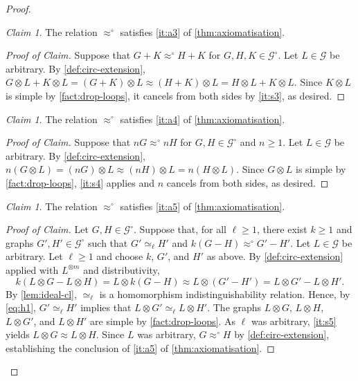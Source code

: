 \documentclass[11pt]{scrartcl}
\theoremstyle{definition}
\theoremstyle{plain}
\theoremstyle{remark}
\newtheorem{claim}[definition]{Claim}
\newenvironment{claimproof}[1][Proof of Claim]{\begin{proof}[#1] \renewcommand{\qedsymbol}{$\lrcorner$}}{ \end{proof}}
\newcommand{\lG}{\mathcal{G}^\circ}
\newcommand{\G}{\mathcal{G}}
\begin{document}
\begin{proof}
		\begin{claim}\label{cl:circ3}
			The relation $\approx^\circ$ satisfies \cref{it:a3} of \cref{thm:axiomatisation}.
		\end{claim}
		\begin{claimproof}
			Suppose that $G + K \approx^\circ H + K$ for $G, H, K \in \lG$.
			Let $L \in \G$ be arbitrary.
			By \cref{def:circ-extension},
			$G \otimes L + K \otimes L = (G + K) \otimes L \approx (H +K) \otimes L = H \otimes L + K \otimes L$.
			Since $K \otimes L$ is simple by \cref{fact:drop-loops}, it cancels from both sides by \cref{it:s3}, as desired.
		\end{claimproof}


		\begin{claim}\label{cl:circ4}
			The relation $\approx^\circ$ satisfies \cref{it:a4} of \cref{thm:axiomatisation}.
		\end{claim}
		\begin{claimproof}
			Suppose that $n G \approx^\circ n H $ for $G, H\in \lG$ and $n\geq 1$.
			Let $L \in \G$ be arbitrary.
			By \cref{def:circ-extension},
			$n (G \otimes L) = (nG)\otimes L \approx (nH)\otimes L  = n(H \otimes L)$.
			Since $G \otimes L$ is simple by \cref{fact:drop-loops}, \cref{it:s4} applies and $n$ cancels from both sides, as desired.
		\end{claimproof}

		\begin{claim}\label{cl:circ5}
			The relation $\approx^\circ$ satisfies \cref{it:a5} of \cref{thm:axiomatisation}.
		\end{claim}
		\begin{claimproof}
			Let $G, H \in \lG$.
			Suppose that, for all $\ell \geq 1$, there exist $k \geq 1$ and graphs $G', H' \in \lG$ such that $G' \simeq_\ell H'$ and $k(G-H) \approx^\circ G'-H'$.
			Let $L \in \G$ be arbitrary.
			Let $\ell \geq 1$ and choose $k$, $G'$, and $H'$ as above.
By \cref{def:circ-extension} applied with $L^{\otimes m}$ and distributivity,
			\[
			k(L \otimes G - L \otimes H) = L \otimes k(G-H) \approx L \otimes ( G'-H') = L \otimes G' - L \otimes H'.
			\]
			By \cref{lem:ideal-cl}, $\simeq_\ell$ is a homomorphism indistinguishability relation.
			Hence, by \cref{eq:h1}, $G' \simeq_\ell H'$ implies that $L \otimes G' \simeq_\ell L \otimes H'$.
			The graphs $L \otimes G$, $L \otimes H$, $L \otimes G'$, and $L \otimes H'$ are simple by \cref{fact:drop-loops}.
			As $\ell$ was arbitrary, \cref{it:s5} yields $L \otimes G \approx L \otimes H$.
			Since $L$ was arbitrary, $G \approx^\circ H$ by \cref{def:circ-extension}, establishing the conclusion of \cref{it:a5} of \cref{thm:axiomatisation}.
		\end{claimproof}


\end{proof}
\end{document}
